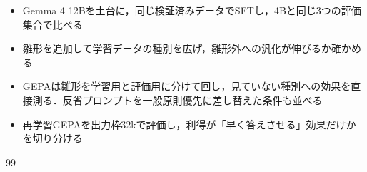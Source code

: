 \documentclass[12pt,a4paper]{article}
\begin{document}
\begin{itemize}
  \item Gemma 4 12Bを土台に，同じ検証済みデータでSFTし，4Bと同じ3つの評価集合で比べる
  \item 雛形を追加して学習データの種別を広げ，雛形外への汎化が伸びるか確かめる
  \item GEPAは雛形を学習用と評価用に分けて回し，見ていない種別への効果を直接測る．反省プロンプトを一般原則優先に差し替えた条件も並べる
  \item 再学習GEPAを出力枠32kで評価し，利得が「早く答えさせる」効果だけかを切り分ける
\end{itemize}



\begin{thebibliography}{99}

\end{thebibliography}

% 
\end{document}
